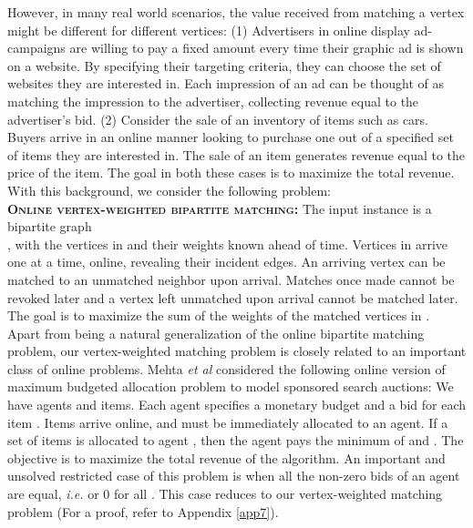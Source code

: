 \documentclass[11pt]{article}
\begin{document}
However, in many real world scenarios, the value received from
matching a vertex might be different for different vertices: (1)
Advertisers in online display ad-campaigns are willing to pay a fixed
amount every time their graphic ad is shown on a website. By
specifying their targeting criteria, they can choose the set of
websites they are interested in. Each impression of an ad can be
thought of as matching the impression to the advertiser, collecting
revenue equal to the advertiser's bid. (2) Consider the sale of an
inventory of items such as cars. Buyers arrive in an online manner
looking to purchase one out of a specified set of items they are
interested in. The sale of an item generates revenue equal to the
price of the item. The goal in both these cases is to maximize the
total revenue.  With this background, we consider the following
problem:\\

\noindent\textsc{\textbf{Online vertex-weighted bipartite matching:}} The input
instance is a bipartite graph\\ , with
the vertices in  and their weights  known ahead of
time. Vertices in  arrive one at a time, online, revealing their
incident edges. An arriving vertex can be matched to an unmatched
neighbor upon arrival. Matches once made cannot be revoked later and a vertex
left unmatched upon arrival cannot be matched later. The goal is to
maximize the sum of the weights of the matched vertices in .\\

Apart from being a natural generalization of the online bipartite
matching problem, our vertex-weighted matching problem is closely
related to an important class of online problems. Mehta \textit{et al}
\cite{MSVV05} considered the following online version of maximum
budgeted allocation problem \cite{GKP01, LLN01} to model sponsored
search auctions: We have  agents and  items. Each agent 
specifies a monetary budget  and a bid  for each item
. Items arrive online, and must be immediately allocated to an
agent. If a set  of items is allocated to agent , then the agent
pays the minimum of  and . The objective is
to maximize the total revenue of the algorithm. An important and
unsolved restricted case of this problem is when all the non-zero bids
of an agent are equal, \textit{i.e.}  or 0 for all
. This case reduces to our vertex-weighted matching problem (For a
proof, refer to Appendix \ref{app7}).
\end{document}

